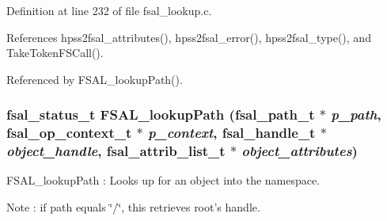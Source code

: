 Definition at line 232 of file fsal\_\-lookup.c.

References hpss2fsal\_\-attributes(), hpss2fsal\_\-error(), hpss2fsal\_\-type(), and Take\-Token\-FSCall().

Referenced by FSAL\_\-lookup\-Path().
\subsubsection{\setlength{\rightskip}{0pt plus 5cm}fsal\_\-status\_\-t FSAL\_\-lookup\-Path (fsal\_\-path\_\-t $\ast$ {\em p\_\-path}, fsal\_\-op\_\-context\_\-t $\ast$ {\em p\_\-context}, fsal\_\-handle\_\-t $\ast$ {\em object\_\-handle}, fsal\_\-attrib\_\-list\_\-t $\ast$ {\em object\_\-attributes})}\label{fsal__lookup_8c_a2}


FSAL\_\-lookup\-Path : Looks up for an object into the namespace.

Note : if path equals \char`\"{}/\char`\"{}, this retrieves root's handle.

